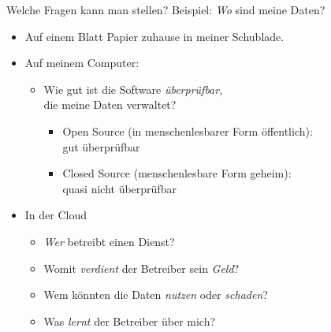 \begin{frame}{Welche Fragen kann man stellen?}
  Beispiel: \emph{Wo} sind meine Daten?
  \begin{itemize}
    \item Auf einem Blatt Papier zuhause in meiner Schublade.
    \item Auf meinem Computer:
    \begin{itemize}
      \item Wie gut ist die Software \emph{überprüfbar},\\ die meine Daten verwaltet?
      \begin{itemize}
        \item Open Source (in menschenlesbarer Form öffentlich):\\gut überprüfbar
        \item Closed Source (menschenlesbare Form geheim):\\quasi nicht überprüfbar
      \end{itemize}
    \end{itemize}
    \item In der Cloud
      \begin{itemize}
        \item \emph{Wer} betreibt einen Dienst?
        \item Womit \emph{verdient} der Betreiber sein \emph{Geld}?
        \item Wem könnten die Daten \emph{nutzen} oder \emph{schaden}?
        \item Was \emph{lernt} der Betreiber über mich?
      \end{itemize}
  \end{itemize}
\end{frame}

